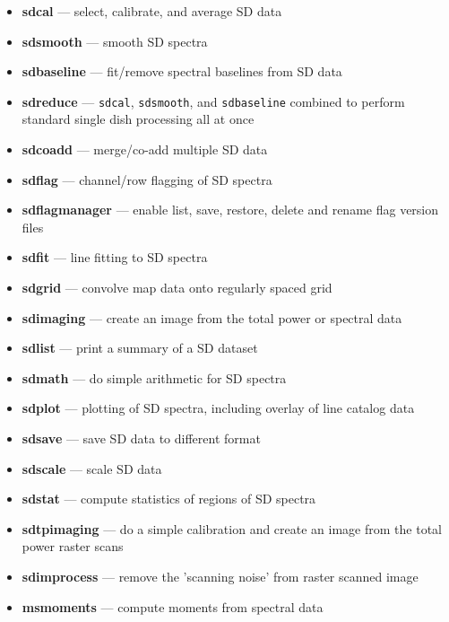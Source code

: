 \begin{itemize}
 
\item {\bf sdcal} --- select, calibrate, and average SD data

\item {\bf sdsmooth} --- smooth SD spectra

\item {\bf sdbaseline} --- fit/remove spectral baselines from SD data

\item {\bf sdreduce} --- {\tt sdcal}, {\tt sdsmooth}, and {\tt sdbaseline} combined to perform standard single dish processing all at once 

\item {\bf sdcoadd} --- merge/co-add multiple SD data

\item {\bf sdflag} --- channel/row flagging of SD spectra

\item {\bf sdflagmanager} --- enable list, save, restore, delete and rename flag version files

\item {\bf sdfit} --- line fitting to SD spectra

\item {\bf sdgrid} --- convolve map data onto regularly spaced grid

\item {\bf sdimaging} --- create an image from the total power or spectral data

\item {\bf sdlist} --- print a summary of a SD dataset

\item {\bf sdmath} --- do simple arithmetic for SD spectra 

\item {\bf sdplot} --- plotting of SD spectra, including overlay of line
catalog data

\item {\bf sdsave} --- save SD data to different format

\item {\bf sdscale} --- scale SD data
 
\item {\bf sdstat} --- compute statistics of regions of SD spectra

\item {\bf sdtpimaging} --- do a simple calibration and create an image from the total power raster scans

\item {\bf sdimprocess} --- remove the 'scanning noise' from raster scanned image  

\item {\bf msmoments} --- compute moments from spectral data

\end{itemize}

